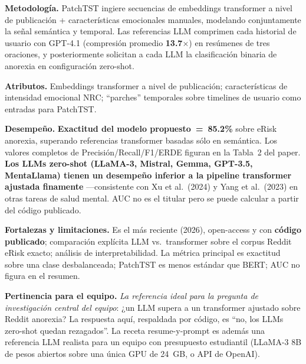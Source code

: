 \documentclass[journal]{IEEEtran}
\begin{document}
\textbf{Metodología.} PatchTST ingiere secuencias de embeddings transformer a nivel de publicación + características emocionales manuales, modelando conjuntamente la señal semántica y temporal. Las referencias LLM comprimen cada historial de usuario con GPT-4.1 (compresión promedio \textbf{13.7$\times$}) en resúmenes de tres oraciones, y posteriormente solicitan a cada LLM la clasificación binaria de anorexia en configuración zero-shot.

\textbf{Atributos.} Embeddings transformer a nivel de publicación; características de intensidad emocional NRC; ``parches'' temporales sobre timelines de usuario como entradas para PatchTST.

\textbf{Desempeño.} \textbf{Exactitud del modelo propuesto~=~85.2\%} sobre eRisk anorexia, superando referencias transformer basadas sólo en semántica. Los valores completos de Precisión/Recall/F1/ERDE figuran en la Tabla~2 del paper. \textbf{Los LLMs zero-shot (LLaMA-3, Mistral, Gemma, GPT-3.5, MentaLlama) tienen un desempeño inferior a la pipeline transformer ajustada finamente} ---consistente con Xu et al.~(2024) y Yang et al.~(2023) en otras tareas de salud mental. AUC no es el titular pero se puede calcular a partir del código publicado.

\textbf{Fortalezas y limitaciones.} Es el más reciente (2026), open-access y con \textbf{código publicado}; comparación explícita LLM vs.~transformer sobre el corpus Reddit eRisk exacto; análisis de interpretabilidad. La métrica principal es exactitud sobre una clase desbalanceada; PatchTST es menos estándar que BERT; AUC no figura en el resumen.

\textbf{Pertinencia para el equipo.} \emph{La referencia ideal para la pregunta de investigación central del equipo}: ¿un LLM supera a un transformer ajustado sobre Reddit anorexia? La respuesta aquí, respaldada por código, es ``no, los LLMs zero-shot quedan rezagados''. La receta resume-y-prompt es además una referencia LLM realista para un equipo con presupuesto estudiantil (LLaMA-3 8B de pesos abiertos sobre una única GPU de 24~GB, o API de OpenAI).
\end{document}

